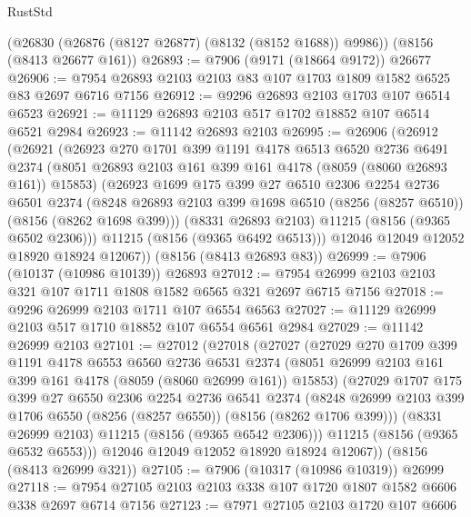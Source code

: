 \begin{lexlean}{RustStd}
\begin{coremodule}
{\begin{coremodule}
{{{{{{{{{{{{{{{{{{{{{{{{{{{{{{{{{{    (@26830 (@26876 (@8127 @26877) (@8132 (@8152 @1688)) @9986))
    (@8156 (@8413 @26677 @161))
@26893 := @7906 (@9171 (@18664 @9172)) @26677
@26906 := @7954 @26893 @2103 @2103 @83 @107 @1703 @1809 @1582 @6525 @83 @2697 @6716 @7156
@26912 := @9296 @26893 @2103 @1703 @107 @6514 @6523
@26921 := @11129 @26893 @2103 @517 @1702 @18852 @107 @6514 @6521 @2984
@26923 := @11142 @26893 @2103
@26995 := @26906
    (@26912
      (@26921
        (@26923
          @270
          @1701
          @399
          @1191
          @4178
          @6513
          @6520
          @2736
          @6491
          @2374
          (@8051 @26893 @2103 @161 @399 @161 @4178 (@8059 (@8060 @26893 @161)) @15853)
          (@26923
            @1699
            @175
            @399
            @27
            @6510
            @2306
            @2254
            @2736
            @6501
            @2374
            (@8248 @26893 @2103 @399 @1698 @6510 (@8256 (@8257 @6510)) (@8156 (@8262 @1698 @399)))
            (@8331 @26893 @2103)
            @11215
            (@8156 (@9365 @6502 @2306)))
          @11215
          (@8156 (@9365 @6492 @6513)))
        @12046
        @12049
        @12052
        @18920
        @18924
        @12067))
    (@8156 (@8413 @26893 @83))
@26999 := @7906 (@10137 (@10986 @10139)) @26893
@27012 := @7954 @26999 @2103 @2103 @321 @107 @1711 @1808 @1582 @6565 @321 @2697 @6715 @7156
@27018 := @9296 @26999 @2103 @1711 @107 @6554 @6563
@27027 := @11129 @26999 @2103 @517 @1710 @18852 @107 @6554 @6561 @2984
@27029 := @11142 @26999 @2103
@27101 := @27012
    (@27018
      (@27027
        (@27029
          @270
          @1709
          @399
          @1191
          @4178
          @6553
          @6560
          @2736
          @6531
          @2374
          (@8051 @26999 @2103 @161 @399 @161 @4178 (@8059 (@8060 @26999 @161)) @15853)
          (@27029
            @1707
            @175
            @399
            @27
            @6550
            @2306
            @2254
            @2736
            @6541
            @2374
            (@8248 @26999 @2103 @399 @1706 @6550 (@8256 (@8257 @6550)) (@8156 (@8262 @1706 @399)))
            (@8331 @26999 @2103)
            @11215
            (@8156 (@9365 @6542 @2306)))
          @11215
          (@8156 (@9365 @6532 @6553)))
        @12046
        @12049
        @12052
        @18920
        @18924
        @12067))
    (@8156 (@8413 @26999 @321))
@27105 := @7906 (@10317 (@10986 @10319)) @26999
@27118 := @7954 @27105 @2103 @2103 @338 @107 @1720 @1807 @1582 @6606 @338 @2697 @6714 @7156
@27123 := @7971 @27105 @2103 @1720 @107 @6606
}}}}}}}}}}}}}}}}}}}}}}}}}}}}}}}}}}
\end{coremodule}}
\end{coremodule}
\end{lexlean}
